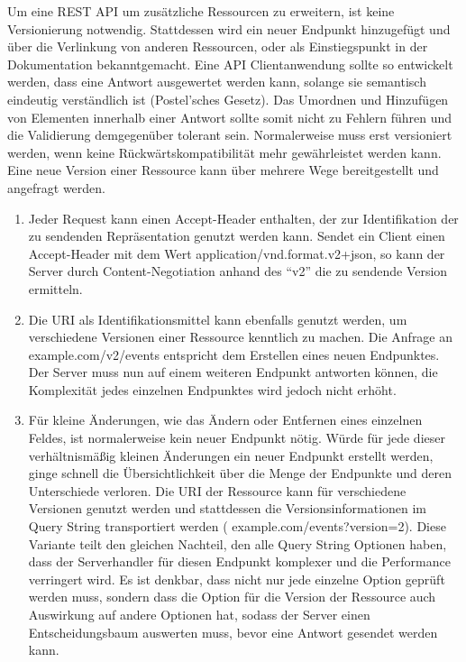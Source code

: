 \par
Um eine REST API um zusätzliche Ressourcen zu erweitern, ist keine Versionierung notwendig.
Stattdessen wird ein neuer Endpunkt hinzugefügt und über die Verlinkung von anderen Ressourcen, oder als Einstiegspunkt in der Dokumentation bekanntgemacht.
Eine API Clientanwendung sollte so entwickelt werden, dass eine Antwort ausgewertet werden kann, solange sie semantisch eindeutig verständlich ist (Postel'sches Gesetz).
Das Umordnen und Hinzufügen von Elementen innerhalb einer Antwort sollte somit nicht zu Fehlern führen und die Validierung demgegenüber tolerant sein.
Normalerweise muss erst versioniert werden, wenn keine Rückwärtskompatibilität mehr gewährleistet werden kann.
Eine neue Version einer Ressource kann über mehrere Wege bereitgestellt und angefragt werden.
\begin{enumerate}
  \item Jeder Request kann einen Accept-Header enthalten, der zur Identifikation der zu sendenden Repräsentation genutzt werden kann.
  Sendet ein Client \zB{} einen Accept-Header mit dem Wert application/vnd.format.v2+json, so kann der Server durch Content-Negotiation anhand des \enquote{v2} die zu sendende Version ermitteln.
  \item Die URI als Identifikationsmittel kann ebenfalls genutzt werden, um verschiedene Versionen einer Ressource kenntlich zu machen.
  Die Anfrage an example.com/v2/events entspricht dem Erstellen eines neuen Endpunktes.
  Der Server muss nun auf einem weiteren Endpunkt antworten können, die Komplexität jedes einzelnen Endpunktes wird jedoch nicht erhöht.
  \item Für kleine Änderungen, wie das Ändern oder Entfernen eines einzelnen Feldes, ist normalerweise kein neuer Endpunkt nötig.
  Würde für jede dieser verhältnismäßig kleinen Änderungen ein neuer Endpunkt erstellt werden, ginge schnell die Übersichtlichkeit über die Menge der Endpunkte und deren Unterschiede verloren.
  Die URI der Ressource kann für verschiedene Versionen genutzt werden und stattdessen die Versionsinformationen im Query String transportiert werden (\zB{} example.com/events?version=2).
  Diese Variante teilt den gleichen Nachteil, den alle Query String Optionen haben, dass der Serverhandler für diesen Endpunkt komplexer und die Performance verringert wird.
  Es ist denkbar, dass nicht nur jede einzelne Option geprüft werden muss, sondern dass die Option für die Version der Ressource auch Auswirkung auf andere Optionen hat, sodass der Server einen Entscheidungsbaum auswerten muss, bevor eine Antwort gesendet werden kann.
\end{enumerate}
